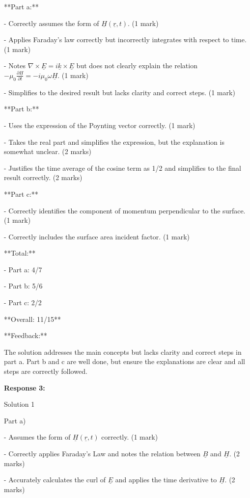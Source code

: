 \documentclass[a4paper,11pt]{article}
\begin{document}
**Part a:**

- Correctly assumes the form of \( \underline{H}(\underline{r}, t) \). (1 mark)

- Applies Faraday’s law correctly but incorrectly integrates with respect to time. (1 mark)

- Notes \( \nabla \times \underline{E} = i \underline{k} \times \underline{E} \) but does not clearly explain the relation \( - \mu_0 \frac{\partial \underline{H}}{\partial t} = - i \mu_0 \omega \underline{H} \). (1 mark)

- Simplifies to the desired result but lacks clarity and correct steps. (1 mark)

**Part b:**

- Uses the expression of the Poynting vector correctly. (1 mark)

- Takes the real part and simplifies the expression, but the explanation is somewhat unclear. (2 marks)

- Justifies the time average of the cosine term as 1/2 and simplifies to the final result correctly. (2 marks)

**Part c:**

- Correctly identifies the component of momentum perpendicular to the surface. (1 mark)

- Correctly includes the surface area incident factor. (1 mark)

**Total:**

- Part a: 4/7

- Part b: 5/6

- Part c: 2/2

**Overall: 11/15**

**Feedback:**

The solution addresses the main concepts but lacks clarity and correct steps in part a. Part b and c are well done, but ensure the explanations are clear and all steps are correctly followed.

\bigskip
\textbf{Response 3:}

Solution 1

Part a)

- Assumes the form of \(\underline{H}(\underline{r}, t)\) correctly. (1 mark)

- Correctly applies Faraday's Law and notes the relation between \(\underline{B}\) and \(\underline{H}\). (2 marks)

- Accurately calculates the curl of \(\underline{E}\) and applies the time derivative to \(\underline{H}\). (2 marks)
\end{document}
